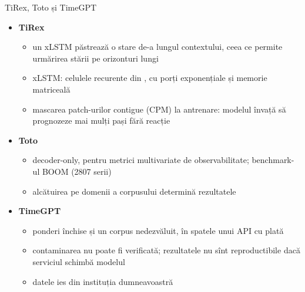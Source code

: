 \begin{frame}{TiRex, Toto și TimeGPT}
\itemsize{\small}
\begin{itemize}
    \item \textbf{TiRex} 
    \begin{itemize}
        \item un xLSTM păstrează o stare de-a lungul contextului, ceea ce permite urmărirea stării pe orizonturi lungi
        \item xLSTM: celulele recurente din , cu porți exponențiale și memorie matriceală
        \item mascarea patch-urilor contigue (CPM) la antrenare: modelul învață să prognozeze mai mulți pași fără reacție
    \end{itemize}
    \item \textbf{Toto} 
    \begin{itemize}
        \item decoder-only, pentru metrici multivariate de observabilitate; benchmark-ul BOOM (2807 serii)
        \item alcătuirea pe domenii a corpusului determină rezultatele
    \end{itemize}
    \item \textbf{TimeGPT} 
    \begin{itemize}
        \item ponderi închise și un corpus nedezvăluit, în spatele unui API cu plată
        \item contaminarea nu poate fi verificată; rezultatele nu sînt reproductibile dacă serviciul schimbă modelul
        \item datele ies din instituția dumneavoastră
    \end{itemize}
\end{itemize}
\end{frame}

